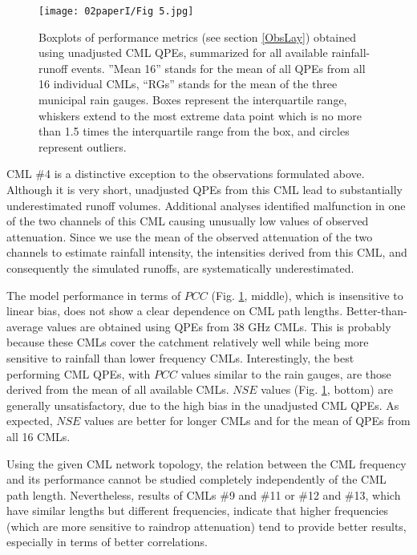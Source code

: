 \documentclass{ctuthesis}\usepackage[]{graphicx}\usepackage[]{color}
\begin{document}
\begin{figure}[H]
\begin{center}
\texttt{[image: 02paperI/Fig 5.jpg]}
\caption{Boxplots of performance metrics (see section \ref{ObsLay}) obtained using unadjusted CML QPEs, summarized for all available rainfall-runoff events. ”Mean 16” stands for the mean of all QPEs from all 16 individual CMLs, “RGs” stands for the mean of the three municipal rain gauges. Boxes represent the interquartile range, whiskers extend to the most extreme data point which is no more than 1.5 times the interquartile range from the box, and circles represent outliers.} \label{2fig5}
\end{center}
\end{figure}

CML \#4 is a distinctive exception to the observations formulated above. Although it is very short, unadjusted QPEs from this CML lead to substantially underestimated runoff volumes. Additional analyses identified malfunction in one of the two channels of this CML causing unusually low values of observed attenuation. Since we use the mean of the observed attenuation of the two channels to estimate rainfall intensity, the intensities derived from this CML, and consequently the simulated runoffs, are systematically underestimated.

The model performance in terms of $PCC$ (Fig. \ref{2fig5}, middle), which is insensitive to linear bias, does not show a clear dependence on CML path lengths. Better-than-average values are obtained using QPEs from 38 GHz CMLs. This is probably because these CMLs cover the catchment relatively well while being more sensitive to rainfall than lower frequency CMLs. Interestingly, the best performing CML QPEs, with $PCC$ values similar to the rain gauges, are those derived from the mean of all available CMLs. $NSE$ values (Fig. \ref{2fig5}, bottom) are generally unsatisfactory, due to the high bias in the unadjusted CML QPEs. As expected, $NSE$ values are better for longer CMLs and for the mean of QPEs from all 16 CMLs.
 
Using the given CML network topology, the relation between the CML frequency and its performance cannot be studied completely independently of the CML path length. Nevertheless, results of CMLs \#9 and \#11 or \#12 and \#13, which have similar lengths but different frequencies, indicate that higher frequencies (which are more sensitive to raindrop attenuation) tend to provide better results, especially in terms of better correlations.
 
\end{document}
